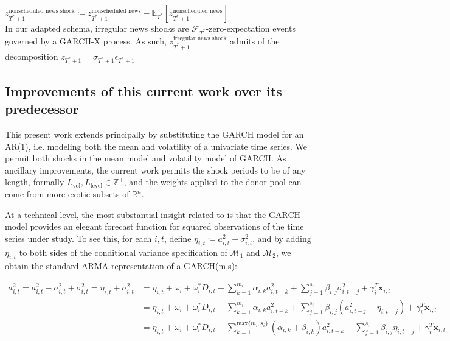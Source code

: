 \documentclass[11pt]{article}
\newcommand{\x}{\textbf{x}}
\def\mc#1{\mathcal{#1}} %
\def\E{\mathbb{E}} %
\def\mc#1{\mathcal{#1}}
\theoremstyle{definition}
\begin{document}
$z_{T^{*}+1}^{\text{nonscheduled news shock}} \coloneqq z_{T^{*}+1}^{\text{nonscheduled news}} - \E_{T^{*}}[z_{T^{*}+1}^{\text{nonscheduled news}}]$ \\

In our adapted schema, irregular news shocks are $\mathcal{F}_{T^{*}}$-zero-expectation events governed by a GARCH-X process.  As such, $z_{T^{*}+1}^{\text{irregular news shock}}$ admits of the decomposition $z_{T^{*}+1} = \sigma_{T^{*}+1}\epsilon_{T^{*}+1}$

\subsection{Improvements of this current work over its predecessor}
This present work extends \citet{lin2021minimizing} principally by substituting the GARCH model for an AR(1), i.e. modeling both the mean and volatility of a univariate time series.  We permit both shocks in the mean model and volatility model of GARCH.  As ancillary improvements, the current work permits the shock periods to be of any length, formally $L_{\text{vol}}, L_{\text{level}} \in \mathbb{Z}^{+}$, and the weights applied to the donor pool can come from more exotic subsets of $\mathbb{R}^{n}$.  

At a technical level, the most substantial insight related to \citet{lin2021minimizing} is that the GARCH model provides an elegant forecast function for squared observations of the time series under study. To see this, for each $i,t$, define $\eta_{i,t} \coloneqq a^{2}_{i,t} - \sigma^{2}_{i,t}$, and by adding $\eta_{i,t}$ to both sides of the conditional variance specification of $\mc{M}_1$ and $\mc{M}_2$, we obtain the standard ARMA representation of a GARCH(m,s):

\begin{align}
a^{2}_{i,t} = a^{2}_{i,t} - \sigma^{2}_{i,t} + \sigma^{2}_{i,t} = \eta_{i,t} + \sigma^{2}_{i,t} &= \eta_{i,t} + \omega_{i} + \omega^{*}_i D_{i,t}  + \sum^{m_{i}}_{k=1}\alpha_{i,k}a^{2}_{i,t-k} + \sum_{j=1}^{s_{i}}\beta_{i,j}\sigma_{i,t-j}^{2} + \gamma_{i}^{T} \x_{i,t} \\
    &= \eta_{i,t} + \omega_{i} + \omega^{*}_i D_{i,t}  + \sum^{m_{i}}_{k=1}\alpha_{i,k}a^{2}_{i,t-k}  + \sum_{j=1}^{s_{i}}\beta_{i,j}(a^{2}_{i,t-j} - \eta_{i,t-j}) + \gamma_{i}^{T} \x_{i,t} \\
    &= \eta_{i,t} + \omega_{i} + \omega^{*}_i D_{i,t}  + \sum^{\text{max}\{m_{i},s_{i}\}}_{k=1}(\alpha_{i,k} + \beta_{i,k})a^{2}_{i,t-k} - \sum_{j=1}^{s_{i}}\beta_{i,j}\eta_{i,t-j} + \gamma_{i}^{T} \x_{i,t}\label{armarep}
\end{align}
\end{document}
